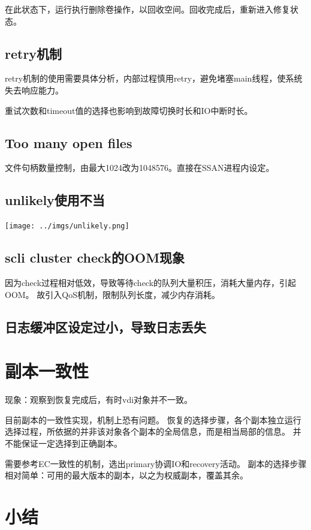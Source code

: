 在此状态下，运行执行删除卷操作，以回收空间。回收完成后，重新进入修复状态。

\subsection{retry机制}

retry机制的使用需要具体分析，内部过程慎用retry，避免堵塞main线程，使系统失去响应能力。

重试次数和timeout值的选择也影响到故障切换时长和IO中断时长。

\subsection{Too many open files}

文件句柄数量控制，由最大1024改为1048576。直接在SSAN进程内设定。

\subsection{unlikely使用不当}

\texttt{[image: ../imgs/unlikely.png]}

\subsection{scli cluster check的OOM现象}

因为check过程相对低效，导致等待check的队列大量积压，消耗大量内存，引起OOM。
故引入QoS机制，限制队列长度，减少内存消耗。

\subsection{日志缓冲区设定过小，导致日志丢失}

\section{副本一致性}

现象：观察到恢复完成后，有时vdi对象并不一致。

目前副本的一致性实现，机制上恐有问题。
恢复的选择步骤，各个副本独立运行选择过程，所依据的并非该对象各个副本的全局信息，而是相当局部的信息。
并不能保证一定选择到正确副本。

需要参考EC一致性的机制，选出primary协调IO和recovery活动。
副本的选择步骤相对简单：可用的最大版本的副本，以之为权威副本，覆盖其余。

\section{小结}

